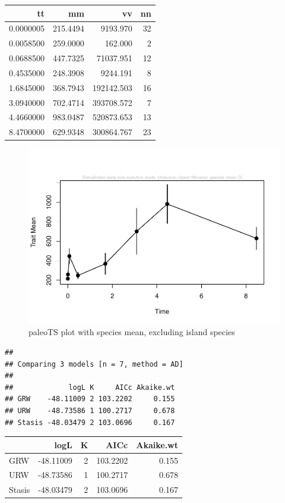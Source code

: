 \documentclass[]{article}
\begin{document}
\begin{longtable}[]{@{}rrrr@{}}
\toprule
tt & mm & vv & nn\tabularnewline
\midrule
\endhead
0.0000005 & 215.4494 & 9193.970 & 32\tabularnewline
0.0058500 & 259.0000 & 162.000 & 2\tabularnewline
0.0688500 & 447.7325 & 71037.951 & 12\tabularnewline
0.4535000 & 248.3908 & 9244.191 & 8\tabularnewline
1.6845000 & 368.7943 & 192142.503 & 16\tabularnewline
3.0940000 & 702.4714 & 393708.572 & 7\tabularnewline
4.4660000 & 983.0487 & 520873.653 & 13\tabularnewline
8.4700000 & 629.9348 & 300864.767 & 23\tabularnewline
\bottomrule
\end{longtable}

\begin{figure}[htbp]
\centering
\includegraphics{MA_JJ_files/figure-latex/paleoTS plot with species mean, excluding island species-1.pdf}
\caption{paleoTS plot with species mean, excluding island species}
\end{figure}

\begin{verbatim}
## 
## Comparing 3 models [n = 7, method = AD]
## 
##             logL K     AICc Akaike.wt
## GRW    -48.11009 2 103.2202     0.155
## URW    -48.73586 1 100.2717     0.678
## Stasis -48.03479 2 103.0696     0.167
\end{verbatim}

\begin{longtable}[]{@{}lrrrr@{}}
\toprule
& logL & K & AICc & Akaike.wt\tabularnewline
\midrule
\endhead
GRW & -48.11009 & 2 & 103.2202 & 0.155\tabularnewline
URW & -48.73586 & 1 & 100.2717 & 0.678\tabularnewline
Stasis & -48.03479 & 2 & 103.0696 & 0.167\tabularnewline
\bottomrule
\end{longtable}
\end{document}
